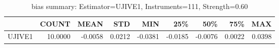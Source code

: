 \begin{table}[ht]
\centering
\caption{bias summary: Estimator=UJIVE1, Instruments=111, Strength=0.60}
\begin{tabular}{lrrrrrrrr}
\toprule
 & COUNT & MEAN & STD & MIN & 25\% & 50\% & 75\% & MAX \\
\midrule
UJIVE1 & 10.0000 & -0.0058 & 0.0212 & -0.0381 & -0.0185 & -0.0076 & 0.0022 & 0.0398 \\
\bottomrule
\end{tabular}
\end{table}
